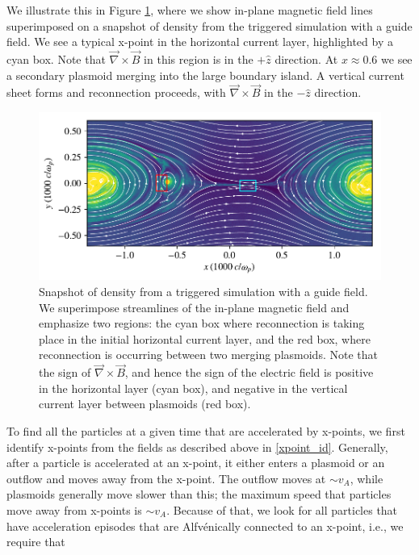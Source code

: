 \documentclass[iop,twocolappendix]{emulateapj}
\begin{document}
We illustrate this in Figure \ref{blines}, where we show in-plane magnetic field lines superimposed on a snapshot of density from the triggered simulation with a guide field.  We see a typical x-point in the horizontal current layer, highlighted by a cyan box.  Note that $\vec{\nabla} \times \vec{B}$ in this region is in the $+\hat{z}$ direction.  At $x\approx0.6$ we see a secondary plasmoid merging into the large boundary island.  A vertical current sheet forms and reconnection proceeds, with $\vec{\nabla} \times \vec{B}$  in the $-\hat{z}$ direction.

\begin{figure}[!h]
	\includegraphics[width=\linewidth]{testing_blines.pdf}
	\caption{Snapshot of density from a triggered simulation with a guide field.  We superimpose streamlines of the in-plane magnetic field and emphasize two regions: the cyan box where reconnection is taking place in the initial horizontal current layer, and the red box, where reconnection is occurring between two merging plasmoids.  Note that the sign of $\vec{\nabla}\times \vec{B}$, and hence the sign of the electric field is positive in the horizontal layer (cyan box), and negative in the vertical current layer between plasmoids (red box).
	}
	\label{blines}
\end{figure}



To find all the particles at a given time that are accelerated by x-points, we first identify x-points from the fields as described above in \ref{xpoint_id}.  Generally, after a particle is accelerated at an x-point, it either enters a plasmoid or an outflow and moves away from the x-point.  The outflow moves at $\sim v_{A}$, while plasmoids generally move slower than this; the maximum speed that particles move away from x-points is $\sim v_{A}$.  Because of that, we look for all particles that have acceleration episodes that are Alfv\'enically connected to an x-point, i.e., we require that 
\end{document}

